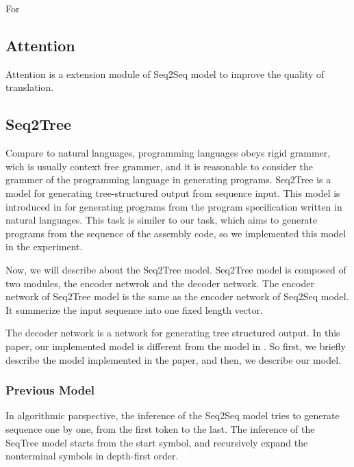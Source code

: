 \documentclass[senior,final,11pt]{iscs-thesis}
\begin{document}

For 




\subsection{Attention}
Attention is a extension module of Seq2Seq model to improve the quality of translation. 



\subsection{Seq2Tree}
Compare to natural languages, programming languages obeys rigid grammer, wich is usually context free grammer,  
and it is reasonable to consider the grammer of the programming language in generating programs.
Seq2Tree is a model for generating tree-structured output from sequence input. This model is introduced in \cite{Seq2Tree} for generating programs from the program specification written in natural languages. 
This task is similer to our task, which aims to generate programs from the sequence of the assembly code, so we implemented this model in the experiment.

Now, we will describe about the Seq2Tree model.
Seq2Tree model is composed of two modules, the encoder netwrok and the decoder network.
The encoder network of Seq2Tree model is the same as the encoder network of Seq2Seq model. It summerize the input sequence into one fixed length vector.

The decoder network is a network for generating tree structured output. 
In this paper, our implemented model is different from the model in \cite{Seq2Tree}. 
So first, we briefly describe the model implemented in the paper, and then, we describe our model.

\subsubsection{Previous Model}
In algorithmic parspective, the inference of the Seq2Seq model tries to generate sequence one by one, from the first token to the last.
The inference of the SeqTree model starts from the start symbol, and recursively expand the nonterminal symbols in depth-first order.
\end{document}
